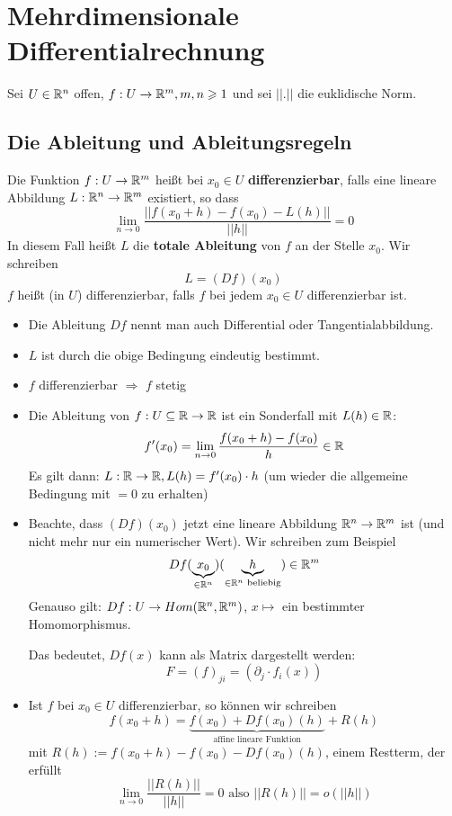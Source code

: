 \documentclass[main.tex]{subfiles}
\begin{document}
\chapter{Mehrdimensionale Differentialrechnung}


Sei $U \in \mathbb{R}^n$ offen, $f: U \to \mathbb{R}^m, m,n \geqslant 1$ und sei $||.||$ die euklidische Norm.


\section{Die Ableitung und Ableitungsregeln}

\begin{Definition}[Differenzierbarkeit]
  Die Funktion $f: U \to \mathbb{R}^m$ heißt bei $x_0 \in U$ \textbf{differenzierbar}, falls eine lineare Abbildung $L:\mathbb{R}^n \to \mathbb{R}^m$ existiert, so dass
  $$\lim \limits_{n \to 0} \dfrac{||f(x_0 + h) - f(x_0) - L(h)||}{||h||} = 0$$
  In diesem Fall heißt $L$ die \textbf{totale Ableitung} von $f$ an der Stelle $x_0$. Wir schreiben
  $$L = (Df)(x_0)$$
  $f$ heißt (in $U$) differenzierbar, falls $f$ bei jedem $x_0 \in U$ differenzierbar ist.
\end{Definition}

\begin{Bemerkung}
  \begin{itemize}
    \item Die Ableitung $Df$ nennt man auch Differential oder Tangentialabbildung.
    \item $L$ ist durch die obige Bedingung eindeutig bestimmt.
    \item $f$ differenzierbar $\Rightarrow$ $f$ stetig
    \item Die Ableitung von $f: U \subseteq \mathbb{R} \to \mathbb{R}$ ist ein Sonderfall mit $L(h) \in \mathbb{R}$:
      $$f'(x_0) = \lim \limits_{n \to 0} \dfrac{f(x_0 + h) - f(x_0)}{h} \in \mathbb{R}$$
      Es gilt dann: $L:\mathbb{R} \to \mathbb{R}, L(h) = f'(x_0)\cdot h$ (um wieder die allgemeine Bedingung mit $= 0$ zu erhalten)
    \item Beachte, dass $(Df)(x_0)$ jetzt eine lineare Abbildung $\mathbb{R}^n \to \mathbb{R}^m$ ist (und nicht mehr nur ein numerischer Wert). Wir schreiben zum Beispiel
      $$Df(\underbrace{x_0}_{\in \mathbb{R}^n})(\underbrace{h}_{\in \mathbb{R}^n \text{ beliebig}}) \in \mathbb{R}^m$$
      Genauso gilt: $Df : U \to Hom(\mathbb{R}^n,\mathbb{R}^m)$, $x \mapsto$ ein bestimmter Homomorphismus.

      Das bedeutet, $Df(x)$ kann als Matrix dargestellt werden:
      $$F = (f)_{ji} = (\partial_j \cdot f_i(x))$$
    \item Ist $f$ bei $x_0 \in U$ differenzierbar, so können wir schreiben
      $$f(x_0 + h) = \underbrace{f(x_0) + Df(x_0)(h)}_{\text{affine lineare Funktion}} + R(h)$$
      mit $R(h) := f(x_0 + h) - f(x_0) -Df(x_0)(h)$, einem Restterm, der erfüllt
      $$\lim \limits_{n \to 0} \dfrac{||R(h)||}{||h||} = 0 \text{ also } ||R(h)|| = {\scriptstyle o}(||h||)$$
  \end{itemize}
\end{Bemerkung}
\end{document}
